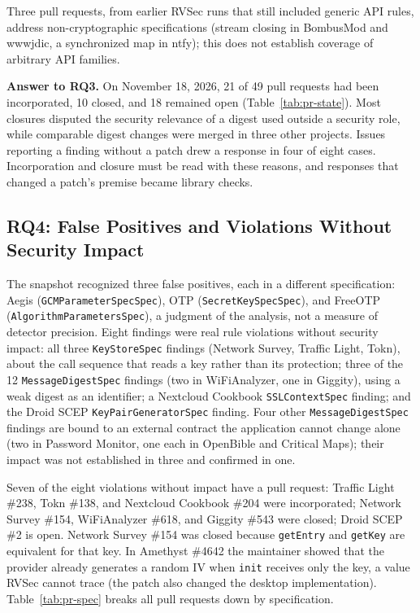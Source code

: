\documentclass[conference]{IEEEtran}
\newcommand{\researchq}[1]{\textbf{RQ#1}}
\begin{document}
Three pull requests, from earlier RVSec runs that still included generic API
rules, address non-cryptographic specifications (stream closing in BombusMod
and wwwjdic, a synchronized map in ntfy); this does not establish coverage of
arbitrary API families.

\textbf{Answer to \researchq{3}.} On November 18, 2026, 21 of 49 pull
requests had been incorporated, 10 closed, and 18 remained open
(Table~\ref{tab:pr-state}). Most closures disputed the security relevance of a
digest used outside a security role, while comparable digest changes were
merged in three other projects. Issues reporting a finding without a patch
drew a response in four of eight cases. Incorporation and closure must be read
with these reasons, and responses that changed a patch's premise became
library checks.

\subsection{\researchq{4}: False Positives and Violations Without Security Impact}

The snapshot recognized three false positives, each in a different
specification: Aegis (\texttt{GCMParameterSpecSpec}), OTP
(\texttt{SecretKeySpecSpec}), and FreeOTP (\texttt{AlgorithmParametersSpec}),
a judgment of the analysis, not a measure of detector precision. Eight
findings were real rule violations without security impact: all three
\texttt{KeyStoreSpec} findings (Network Survey, Traffic Light, Tokn), about
the call sequence that reads a key rather than its protection; three of the 12
\texttt{MessageDigestSpec} findings (two in WiFiAnalyzer, one in Giggity),
using a weak digest as an identifier; a Nextcloud Cookbook
\texttt{SSLContextSpec} finding; and the Droid SCEP
\texttt{KeyPairGeneratorSpec} finding. Four other \texttt{MessageDigestSpec}
findings are bound to an external contract the application cannot change alone
(two in Password Monitor, one each in OpenBible and Critical Maps); their
impact was not established in three and confirmed in one.

Seven of the eight violations without impact have a pull request: Traffic
Light \#238, Tokn \#138, and Nextcloud Cookbook \#204 were incorporated;
Network Survey \#154, WiFiAnalyzer \#618, and Giggity \#543 were closed; Droid
SCEP \#2 is open. Network Survey \#154 was closed because \texttt{getEntry}
and \texttt{getKey} are equivalent for that key. In Amethyst \#4642 the
maintainer showed that the provider already generates a random IV when
\texttt{init} receives only the key, a value RVSec cannot trace (the patch
also changed the desktop implementation). Table~\ref{tab:pr-spec} breaks all
pull requests down by specification.
\end{document}
